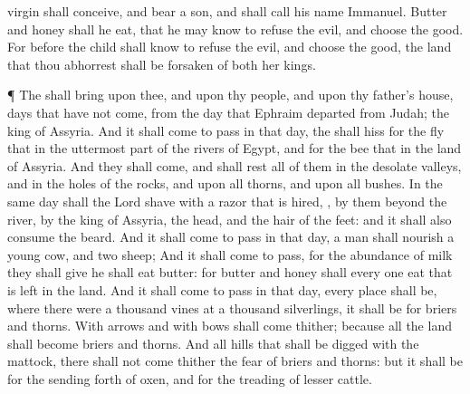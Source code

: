 {virgin shall
conceive, and
bear a
son, and shall
call his
name
Immanuel.
Butter and
honey shall he
eat, that he may
know to
refuse the
evil, and
choose the
good.
For before the
child shall
know to
refuse the
evil, and
choose the
good, the
land that thou
abhorrest shall
be
forsaken of
both her
kings.
\par }{\PP {}¶ The
{} shall
bring upon thee, and upon thy
people, and upon thy
father’s
house,
days that have not
come, from the
day that
Ephraim
departed from
Judah;
{} the
king of
Assyria.
And it shall come to pass in that
day,
{} the
{} shall
hiss for the
fly that
{} in the uttermost
part of the
rivers of
Egypt, and for the
bee that
{} in the
land of
Assyria.
And they shall
come, and shall
rest all of them in the
desolate
valleys, and in the
holes of the
rocks, and upon all
thorns, and upon all
bushes.
In the same
day shall the
Lord
shave with a
razor that is
hired,
{}, by them
beyond the
river, by the
king of
Assyria, the
head, and the
hair of the
feet: and it shall also
consume the
beard.
And it shall come to pass in that
day,
{} a
man shall
nourish a
young
cow, and
two
sheep;
And it shall come to pass, for the
abundance of
milk
{} they shall
give he shall
eat
butter: for
butter and
honey shall every one
eat that is
left
in the
land.
And it shall come to pass in that
day,
{} every
place shall be, where there were a
thousand
vines at a
thousand
silverlings, it shall
{} be for
briers and
thorns.
With
arrows and with
bows shall
{}
come thither; because all the
land shall become
briers and
thorns.
And
{} all
hills that shall be
digged with the
mattock, there shall not come
thither the
fear of
briers and
thorns: but it shall be for the sending
forth of
oxen, and for the
treading of lesser
cattle.

}
